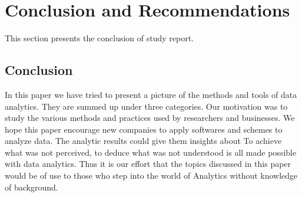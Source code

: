 \setlength{\footskip}{8mm}

\chapter{Conclusion and Recommendations}
\label{ch:conclusion}

This section presents the conclusion of study report.

\section{Conclusion}

In this paper we have tried to present a picture of the methods and tools of data analytics. They are summed up under three categories. Our motivation was to study the various methods and practices used by researchers and businesses.
We hope this paper encourage new companies to apply softwares and schemes to analyze data. The analytic results could give them insights about
To achieve what was not perceived, to deduce what was not understood is all made possible with data analytics. Thus it is our effort that the topics discussed in this paper would be of use to those who step into the world of Analytics without knowledge of background.

%

\FloatBarrier

